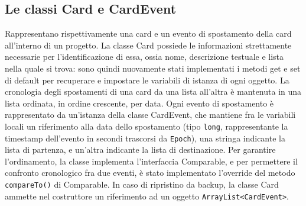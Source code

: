 \documentclass{article}
\begin{document}
\subsection{Le classi Card e CardEvent}
Rappresentano rispettivamente una card e un evento di spostamento della card all'interno di un progetto.
La classe Card possiede le informazioni strettamente necessarie per l'identificazione di essa, ossia nome, descrizione testuale e lista nella quale si trova: sono quindi nuovamente stati implementati i metodi get e set di default per recuperare e impostare le variabili di istanza di ogni oggetto. La cronologia degli spostamenti di una card da una lista all'altra è mantenuta in una lista ordinata, in ordine crescente, per data. Ogni evento di spostamento è rappresentato da un'istanza della classe CardEvent, che mantiene fra le variabili locali un riferimento alla data dello spostamento (tipo \texttt{long}, rappresentante la timestamp dell'evento in secondi trascorsi da \texttt{Epoch}), una stringa indicante la lista di partenza, e un'altra indicante la lista di destinazione. Per garantire l'ordinamento, la classe implementa l'interfaccia Comparable, e per permettere il confronto cronologico fra due eventi, è stato implementato l'override del metodo \texttt{compareTo()} di Comparable.
In caso di ripristino da backup, la classe Card ammette nel costruttore un riferimento ad un oggetto \texttt{ArrayList<CardEvent>}.
\end{document}
